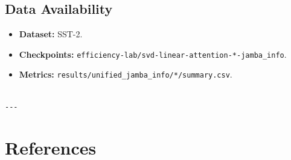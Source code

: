 \subsection{Data Availability}

\begin{itemize}
\item \textbf{Dataset:} SST-2.
\item \textbf{Checkpoints:} \texttt{efficiency-lab/svd-linear-attention-*-jamba\_info}.
\item \textbf{Metrics:} \texttt{results/unified\_jamba\_info/*/summary.csv}.
\end{itemize}
\begin{lstlisting}

---
\end{lstlisting}

\section{References}

